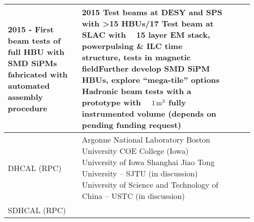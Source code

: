 \begin{landscape}
\begin{sidewaystable}
\begin{adjustbox}{max width=1.1\textwidth,totalheight=1\textheight}
\begin{tabularx}{2\textheight}{lXXXX}
     2015 - First beam tests of full HBU with SMD SiPMs fabricated with automated assembly procedure                                         &
     2015 Test beams at DESY and SPS with \textgreater 15 HBUs\newline
     2016/17 Test beam at SLAC with ~ 15 layer EM stack, powerpulsing \& ILC time structure, tests in magnetic fieldFurther develop SMD SiPM HBUs, explore ``mega-tile'' options \newline
    Hadronic beam tests with a prototype with ~ $\unit[1]{m^3}$ fully instrumented volume (depends on pending funding request) \\
    \midrule
    DHCAL (RPC)	&
    Argonne National Laboratory\newline
    Boston University                  \newline
    COE College (Iowa)                         \newline
    University of Iowa                                 \newline
    Shanghai Jiao Tong University -- SJTU (in discussion)      \newline
    University of Science and Technology of China -- USTC (in discussion) &
     &
     &                                                                                                                                                                                                                                   \\
     \midrule
    SDHCAL (RPC)                                                                                                   &                                                                                                                                         &                                                                                                                                                                                                                                                                                                                                                                                      &                                                                                                                                                                                                                                                                 &                                                                                                                                                                                                                                     \\

\end{tabularx}
\end{adjustbox}
\end{sidewaystable}
\end{landscape}
